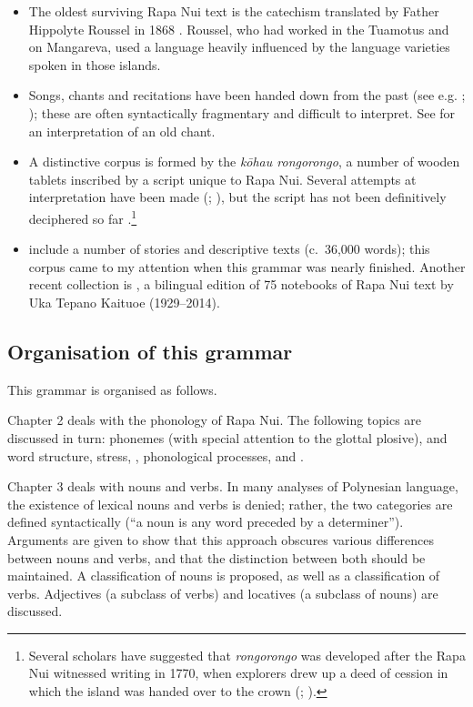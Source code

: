 \begin{itemize}
\item 
The oldest surviving Rapa Nui text is the catechism translated by Father Hippolyte Roussel in 1868 \citep{Roussel1995}. Roussel, who had worked in the Tuamotus and on Mangareva, used a language heavily influenced by the language varieties spoken in those islands.

\item 
Songs, chants and recitations have been handed down from the past (see e.g. \citealt{Campbell1970}; \citealt{Barthel1960}); these are often syntactically fragmentary and difficult to interpret. See \citet{Fischer1994} for an interpretation of an old chant.

\item 
A distinctive corpus is formed by the \textit{kōhau rongorongo}, a number of wooden tablets inscribed by a script unique to Rapa Nui. Several attempts at interpretation have been made (\citealt{Barthel1958}; \citealt{Fischer1997}), but the script has not been definitively deciphered so far \citep{Davletshin2012}.\footnote{\label{fn:30}Several scholars have suggested that \textit{rongorongo} was developed after the Rapa Nui witnessed writing in 1770, when  explorers drew up a deed of cession in which the island was handed over to the  crown (\citealt{Emory1972}; \citealt{Fischer1996Reply,Fischer1997}).}

\item 
\citet{GleisnerMontt2014} include a number of stories and descriptive texts (c.~36,000 words); this corpus came to my attention when this grammar was nearly finished. Another recent collection is \citet{TepanoKaituoe2015}, a bilingual edition of 75 notebooks of Rapa Nui text by Uka Tepano Kaituoe (1929–2014).

\end{itemize}
\subsection{Organisation of this grammar}\label{sec:1.6.3}

This grammar is organised as follows.

Chapter 2 deals with the phonology of Rapa Nui. The following topics are discussed in turn: phonemes (with special attention to the glottal plosive),  and word structure, stress, , phonological processes, and . 

Chapter 3 deals with nouns and verbs. In many analyses of Polynesian language, the existence of lexical nouns and verbs is denied; rather, the two categories are defined syntactically (“a noun is any word preceded by a determiner”). Arguments are given to show that this approach obscures various differences between nouns and verbs, and that the distinction between both should be maintained. A classification of nouns is proposed, as well as a classification of verbs. Adjectives (a subclass of verbs) and locatives (a subclass of nouns) are discussed.


